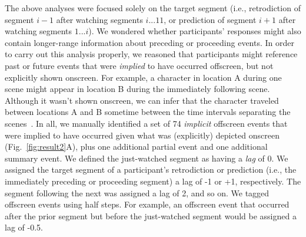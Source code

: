 \documentclass[10pt]{article}
\begin{document}
The above analyses were focused solely on the target segment (i.e., retrodiction of segment $i - 1$ after watching segments $i...11$, or prediction of segment $i + 1$ after watching segments $1...i$).  We wondered whether participants' responses might also contain longer-range information about preceding or proceeding events.  In order to carry out this analysis properly, we reasoned that participants might reference past or future events that were \textit{implied} to have occurred offscreen, but not explicitly shown onscreen.  For example, a character in location A during one scene might appear in location B during the immediately following scene.  Although it wasn't shown onscreen, we can infer that the character traveled between locations A and B sometime between the time intervals separating the scenes~\citep{Bord08}.  In all, we manually identified a set of 74 \textit{implicit} offscreen events that were implied to have occurred given what was (explicitly) depicted onscreen (Fig.~\ref{fig:result2}A), plus one additional partial event and one additional summary event.  We defined the just-watched segment as having a \textit{lag} of 0.  We assigned the target segment of a participant's retrodiction or prediction (i.e., the immediately preceding or proceeding segment) a lag of -1 or +1, respectively.  The segment following the next was assigned a lag of 2, and so on.  We tagged offscreen events using half steps.  For example, an offscreen event that occurred after the prior segment but before the just-watched segment would be assigned a lag of -0.5.
\end{document}
